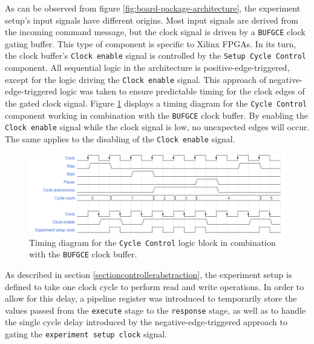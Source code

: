 \documentclass[main.tex]{subfiles}
\begin{document}
As can be observed from figure \ref{fig:board-package-architecture}, the experiment setup's input signals have different origins. Most input signals are derived from the incoming command message, but the clock signal is driven by a \texttt{BUFGCE} clock gating buffer. This type of component is specific to Xilinx FPGAs. In its turn, the clock buffer's \texttt{Clock enable} signal is controlled by the \texttt{Setup Cycle Control} component. All sequential logic in the architecture is positive-edge-triggered, except for the logic driving the \texttt{Clock enable} signal. This approach of negative-edge-triggered logic was taken to ensure predictable timing for the clock edges of the gated clock signal. Figure \ref{fig:timing-cycle-control} displays a timing diagram for the \texttt{Cycle Control} component working in combination with the \texttt{BUFGCE} clock buffer. By enabling the \texttt{Clock enable} signal while the clock signal is low, no unexpected edges will occur. The same applies to the disabling of the \texttt{Clock enable} signal. 

\begin{figure}[h]
\centering
\caption{Timing diagram for the \texttt{Cycle Control} logic block in combination with the \texttt{BUFGCE} clock buffer.}
\label{fig:timing-cycle-control}
\includegraphics[width=\textwidth]{img/cycle-control}
\end{figure}

As described in section \ref{sectioncontrollerabstraction}, the experiment setup is defined to take one clock cycle to perform read and write operations. In order to allow for this delay, a pipeline register was introduced to temporarily store the values passed from the \texttt{execute} stage to the \texttt{response} stage, as well as to handle the single cycle delay introduced by the negative-edge-triggered approach to gating the \texttt{experiment setup clock} signal.
\end{document}
